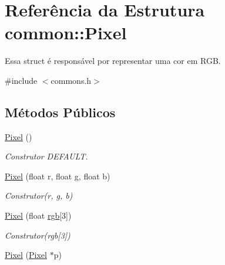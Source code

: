 \hypertarget{structcommon_1_1Pixel}{}\section{Referência da Estrutura common\+:\+:Pixel}
\label{structcommon_1_1Pixel}


Essa struct é responsável por representar uma cor em R\+GB.  




{\ttfamily \#include $<$commons.\+h$>$}

\subsection*{Métodos Públicos}
\begin{DoxyCompactItemize}
\item 
\hyperlink{structcommon_1_1Pixel_ad8c36da59c20dd2b6f547e6dcbc7f273}{Pixel} ()\hypertarget{structcommon_1_1Pixel_ad8c36da59c20dd2b6f547e6dcbc7f273}{}\label{structcommon_1_1Pixel_ad8c36da59c20dd2b6f547e6dcbc7f273}

\begin{DoxyCompactList}\small\item\em Construtor D\+E\+F\+A\+U\+LT. \end{DoxyCompactList}\item 
\hyperlink{structcommon_1_1Pixel_aea7b41418980e0696fb78870d42abbe3}{Pixel} (float r, float g, float b)\hypertarget{structcommon_1_1Pixel_aea7b41418980e0696fb78870d42abbe3}{}\label{structcommon_1_1Pixel_aea7b41418980e0696fb78870d42abbe3}

\begin{DoxyCompactList}\small\item\em Construtor(r, g, b) \end{DoxyCompactList}\item 
\hyperlink{structcommon_1_1Pixel_a4a3df22498da4d45cbd0295e223470ed}{Pixel} (float \hyperlink{structcommon_1_1Pixel_abf3e7070359fa300aeed9af22c74f118}{rgb}\mbox{[}3\mbox{]})\hypertarget{structcommon_1_1Pixel_a4a3df22498da4d45cbd0295e223470ed}{}\label{structcommon_1_1Pixel_a4a3df22498da4d45cbd0295e223470ed}

\begin{DoxyCompactList}\small\item\em Construtor(rgb\mbox{[}3\mbox{]}) \end{DoxyCompactList}\item 
\hyperlink{structcommon_1_1Pixel_a7d987f23631f0695a2c8c8d5274842e0}{Pixel} (\hyperlink{structcommon_1_1Pixel}{Pixel} $\ast$p)\hypertarget{structcommon_1_1Pixel_a7d987f23631f0695a2c8c8d5274842e0}{}\label{structcommon_1_1Pixel_a7d987f23631f0695a2c8c8d5274842e0}


\end{DoxyCompactItemize}
